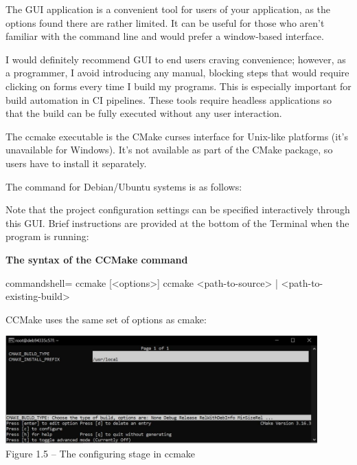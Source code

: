 The GUI application is a convenient tool for users of your application, as the options found there are rather limited. It can be useful for those who aren't familiar with the command line and would prefer a window-based interface.

\begin{tcolorbox}[colback=blue!5!white,colframe=blue!75!black,title=Not Recommended]
I would definitely recommend GUI to end users craving convenience; however, as a programmer, I avoid introducing any manual, blocking steps that would require clicking on forms every time I build my programs. This is especially important for build automation in CI pipelines. These tools require headless applications so that the build can be fully executed without any user interaction.
\end{tcolorbox}


The ccmake executable is the CMake curses interface for Unix-like platforms (it's  unavailable for Windows). It's not available as part of the CMake package, so users have to  install it separately.
 
The command for Debian/Ubuntu systems is as follows:
 
 
Note that the project configuration settings can be specified interactively through this GUI. Brief instructions are provided at the bottom of the Terminal when the program is running: 

\textbf{The syntax of the CCMake command}
 
\begin{tcblisting}{commandshell={}}
ccmake [<options>]
ccmake {<path-to-source> | <path-to-existing-build>}
\end{tcblisting}
 
CCMake uses the same set of options as cmake:
 
\begin{center}
\includegraphics[width=0.9\textwidth]{content/1/chapter1/images/5.jpg}\\
Figure 1.5 – The configuring stage in ccmake
\end{center}
 
